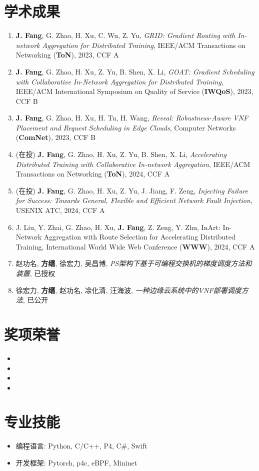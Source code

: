 \documentclass{resume}
\begin{document}
\section{学术成果}

\begin{enumerate}[parsep=0.5ex]
  \item \textbf{J. Fang}, G. Zhao, H. Xu, C. Wu, Z. Yu, \textit{GRID: Gradient Routing with In-network Aggregation for Distributed Training}, IEEE/ACM Transactions on Networking (\textbf{ToN}), 2023, CCF A
  \item \textbf{J. Fang}, G. Zhao, H. Xu, Z. Yu, B. Shen, X. Li, \textit{GOAT: Gradient Scheduling with Collaborative In-Network Aggregation for Distributed Training}, IEEE/ACM International Symposium on Quality of Service (\textbf{IWQoS}), 2023, CCF B
  \item \textbf{J. Fang}, G. Zhao, H. Xu, H. Tu, H. Wang, \textit{Reveal: Robustness-Aware VNF Placement and Request Scheduling in Edge Clouds}, Computer Networks (\textbf{ComNet}), 2023, CCF B
  \item (在投) \textbf{J. Fang}, G. Zhao, H. Xu, Z. Yu, B. Shen, X. Li, \textit{Accelerating Distributed Training with Collaborative In-network Aggregation}, IEEE/ACM Transactions on Networking (\textbf{ToN}), 2024, CCF A
  \item (在投) \textbf{J. Fang}, G. Zhao, H. Xu, Z. Yu, J. Jiang, F. Zeng, \textit{Injecting Failure for Success: Towards General, Flexible and Efficient Network Fault Injection}, USENIX ATC, 2024, CCF A
  \item J. Liu, Y. Zhai, G. Zhao, H. Xu, \textbf{J. Fang}, Z. Zeng, Y. Zhu, InArt: In-Network Aggregation with Route Selection for Accelerating Distributed Training, International World Wide Web Conference (\textbf{WWW}), 2024, CCF A
  \item 赵功名, \textbf{方缙}, 徐宏力, 吴昌博, \textit{PS架构下基于可编程交换机的梯度调度方法和装置}, 已授权
  \item 徐宏力, \textbf{方缙}, 赵功名, 凃化清, 汪海波, \textit{一种边缘云系统中的VNF部署调度方法}, 已公开
\end{enumerate}

\section{奖项荣誉}

\begin{itemize}[parsep=0.5ex]
  \item {}
  \item {}
  \item {}
  \item {}
\end{itemize}

\section{专业技能}

\begin{itemize}[parsep=0.5ex]
  \item 编程语言: Python, C/C++, P4, C\#, Swift
  \item 开发框架: Pytorch, p4c, eBPF, Mininet
\end{itemize}
\end{document}
